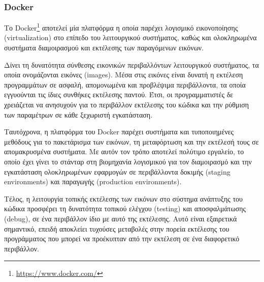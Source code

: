 \subsubsection{Docker} \label{subsection:4-2-1-2-docker}


Το Docker\footnote{\url{https://www.docker.com/}} αποτελεί μία πλατφόρμα η οποία παρέχει λογισμικό εικονοποίησης (virtualization) στο επίπεδο του λειτουργικού συστήματος, καθώς και ολοκληρωμένα συστήματα διαμοιρασμού και εκτέλεσης των παραγόμενων εικόνων.

Δίνει τη δυνατότητα σύνθεσης εικονικών περιβαλλόντων λειτουργικού συστήματος, τα οποία ονομάζονται εικόνες (images). Μέσα στις εικόνες είναι δυνατή η εκτέλεση προγραμμάτων σε ασφαλή, απομονωμένα και προβλέψιμα περιβάλλοντα, τα οποία εγγυούνται τις ίδιες συνθήκες εκτέλεσης παντού. Έτσι, οι προγραμματιστές δε χρειάζεται να ανησυχούν για το περιβάλλον εκτέλεσης του κώδικα και την ρύθμιση των παραμέτρων σε κάθε ξεχωριστή εγκατάσταση.

Ταυτόχρονα, η πλατφόρμα του Docker παρέχει συστήματα και τυποποιημένες μεθόδους για το πακετάρισμα των εικόνων, τη μεταφόρτωση και την εκτέλεσή τους σε απομακρυσμένα συστήματα. Με αυτόν τον τρόπο αποτελεί πολύτιμο εργαλείο, το οποίο έχει γίνει το στάνταρ στη βιομηχανία λογισμικού για τον διαμοιρασμό και την εγκατάσταση ολοκληρωμένων εφαρμογών σε περιβάλλοντα δοκιμής (staging environments) και παραγωγής (production environments).

Τέλος, η λειτουργία τοπικής εκτέλεσης των εικόνων στο σύστημα ανάπτυξης του κώδικα προσφέρει τη δυνατότητα τοπικού ελέγχου (testing) και αποσφαλμάτωσης (debug), σε ένα περιβάλλον ίδιο με αυτό της εκτέλεσης. Αυτό είναι εξαιρετικά σημαντικό, επειδή αποκλείει τυχούσες μεταβολές στην πορεία εκτέλεσης του προγράμματος που μπορεί να προέκυπταν από την εκτέλεση σε ένα διαφορετικό περιβάλλον.

